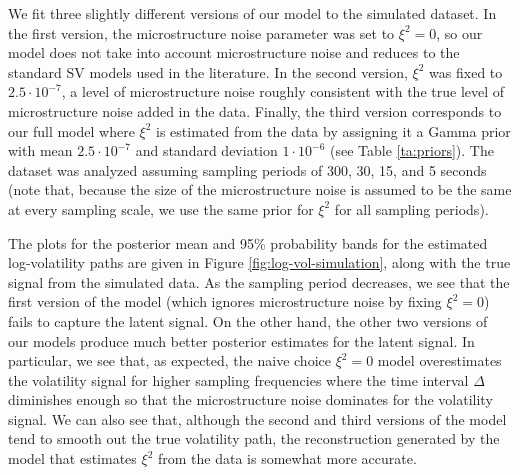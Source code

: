 \documentclass[10pt]{article}
\begin{document}
We fit three slightly different versions of our model to the simulated dataset.  In the first version, the microstructure noise parameter was set to $\xi^2 = 0$, so our model does not take into account microstructure noise and reduces to the standard SV models used in the literature. In the second version, $\xi^2$ was fixed to $2.5\cdot 10^{-7}$, a level of microstructure noise roughly consistent with the true level of microstructure noise added in the data.  Finally, the third version corresponds to our full model where $\xi^2$ is estimated from the data by assigning it a Gamma prior with mean $2.5\cdot 10^{-7}$ and standard deviation $1\cdot 10^{-6}$ (see Table \ref{ta:priors}).  The dataset was analyzed assuming sampling periods of 300, 30, 15, and 5 seconds (note that, because the size of the microstructure noise is assumed to be the same at every sampling scale, we use the same prior for $\xi^2$ for all sampling periods).

The plots for the posterior mean and 95\% probability bands for the estimated log-volatility paths are given in Figure \ref{fig:log-vol-simulation}, along with the true signal from the simulated data. As the sampling period decreases, we see that the first version of the model (which ignores microstructure noise by fixing $\xi^2 = 0$) fails to capture the latent signal. On the other hand, the other two versions of our models produce much better posterior estimates for the latent signal. In particular, we see that, as expected, the naive choice $\xi^2 = 0$ model overestimates the volatility signal for higher sampling frequencies where the time interval $\Delta$ diminishes enough so that the microstructure noise dominates for the volatility signal.  We can also see that, although the second and third versions of the model tend to smooth out the true volatility path, the reconstruction generated by the model that estimates $\xi^2$ from the data is somewhat more accurate.
\end{document}

